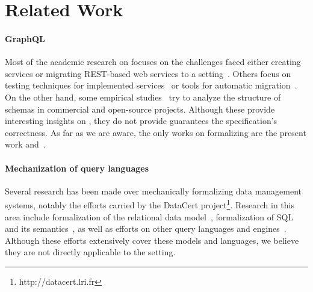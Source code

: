 \section{Related Work}\label{sec:related}

\paragraph{GraphQL} Most of the academic research on \gql focuses on the challenges faced either creating \gql services or migrating REST-based web services to a \gql setting~\cite{improvingoeeu, ehriapi, gqlexperiences}. 
Others focus on testing techniques for implemented \gql services~\cite{gqldeviation} or tools for automatic migration~\cite{migratingapi}. 
On the other hand, some empirical studies~\cite{empiricalgql, empiricalapi} try to analyze the structure of schemas in commercial and open-source projects. 
Although these provide interesting insights on \gql, they do not provide guarantees \wrt the specification's correctness. 
As far as we are aware, the only works on formalizing \gql are the present work and~\cite{gqlph}.

\paragraph{Mechanization of query languages} Several research has been made over mechanically formalizing data management systems, notably the efforts carried by the DataCert project\footnote{http://datacert.lri.fr}. 
Research in this area include formalization of the relational data model~\cite{relationalcoq}, formalization of SQL and its semantics~\cite{sqlequiv, hottsql, vesqlengines, vesqlsemantics}, 
as well as efforts on other query languages and engines~\cite{certifdatalog}. Although these efforts extensively cover these models and languages, we believe they are 
not directly applicable to the \gql setting. 

